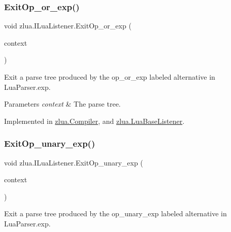 \subsubsection{\texorpdfstring{Exit\+Op\+\_\+or\+\_\+exp()}{ExitOp\_or\_exp()}}
{\footnotesize\ttfamily void zlua.\+I\+Lua\+Listener.\+Exit\+Op\+\_\+or\+\_\+exp (\begin{DoxyParamCaption}\item[{\mbox{[}\+Not\+Null\mbox{]} \mbox{\hyperlink{classzlua_1_1_lua_parser_1_1_op__or__exp_context}{Lua\+Parser.\+Op\+\_\+or\+\_\+exp\+Context}}}]{context }\end{DoxyParamCaption})}



Exit a parse tree produced by the {\ttfamily op\+\_\+or\+\_\+exp} labeled alternative in Lua\+Parser.\+exp. 


\begin{DoxyParams}{Parameters}
{\em context} & The parse tree.\\
\hline
\end{DoxyParams}


Implemented in \mbox{\hyperlink{classzlua_1_1_compiler_a64367a7cac1636be85228c39a80b0ae7}{zlua.\+Compiler}}, and \mbox{\hyperlink{classzlua_1_1_lua_base_listener_a2f3d1101cea30188e37757f54eeb45ad}{zlua.\+Lua\+Base\+Listener}}.

\mbox{\label{interfacezlua_1_1_i_lua_listener_a16b9b227b375c5bbe949db6e101f2dce}} 
\subsubsection{\texorpdfstring{Exit\+Op\+\_\+unary\+\_\+exp()}{ExitOp\_unary\_exp()}}
{\footnotesize\ttfamily void zlua.\+I\+Lua\+Listener.\+Exit\+Op\+\_\+unary\+\_\+exp (\begin{DoxyParamCaption}\item[{\mbox{[}\+Not\+Null\mbox{]} \mbox{\hyperlink{classzlua_1_1_lua_parser_1_1_op__unary__exp_context}{Lua\+Parser.\+Op\+\_\+unary\+\_\+exp\+Context}}}]{context }\end{DoxyParamCaption})}



Exit a parse tree produced by the {\ttfamily op\+\_\+unary\+\_\+exp} labeled alternative in Lua\+Parser.\+exp. 



